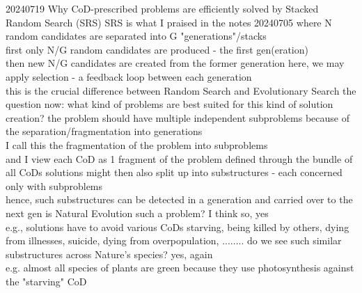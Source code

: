 \documentclass{article}\usepackage[margin=2cm]{geometry}
\begin{document}
\begin{cascade}
    20240719
    \stepin
    Why CoD-prescribed problems are efficiently solved by Stacked Random Search (SRS)
    \stepin
    SRS is what I praised in the notes 20240705
    \stepin
    where N random candidates are separated into G "generations"/stacks\\
    first only N/G random candidates are produced - the first gen(eration)\\
    then new N/G candidates are created from the former generation
    \stepin
    here, we may apply selection - a feedback loop between each generation\\
    this is the crucial difference between Random Search and Evolutionary Search
    \stepout
    \stepout
    the question now: what kind of problems are best suited for this kind of solution creation?
    \stepin
    the problem should have multiple independent subproblems
    \stepin
    because of the separation/fragmentation into generations\\
    I call this the fragmentation of the problem into subproblems\\
    and I view each CoD as 1 fragment of the problem defined through the bundle of all CoDs
    \stepout
    solutions might then also split up into substructures - each concerned only with subproblems\\
    hence, such substructures can be detected in a generation and carried over to the next gen
    \stepout
    is Natural Evolution such a problem?
    \stepin
    I think so, yes\\
    e.g., solutions have to avoid various CoDs
    \stepin
    starving, being killed by others, dying from illnesses, suicide, dying from overpopulation, ........
    \stepout
    \stepout
    do we see such similar substructures across Nature's species?
    \stepin
    yes, again\\
    e.g. almost all species of plants are green because they use photosynthesis against the "starving" CoD
\end{cascade}
\end{document}
